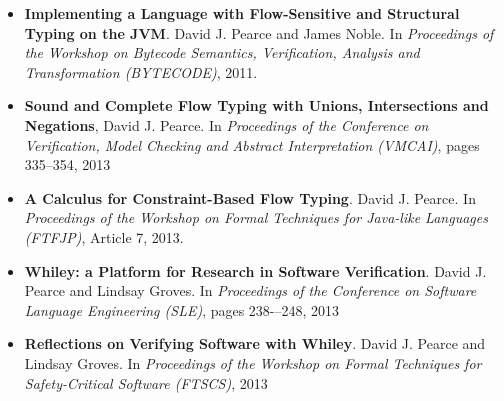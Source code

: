 \begin{itemize}
\item {\bf Implementing a Language with Flow-Sensitive and Structural Typing on the JVM}.  David J. Pearce and James Noble. In {\em Proceedings of the Workshop on Bytecode Semantics, Verification, Analysis and Transformation (BYTECODE)}, 2011. 

\item {\bf Sound and Complete Flow Typing with Unions, Intersections and Negations}, David J. Pearce.  In {\em Proceedings of the Conference on Verification, Model Checking and Abstract Interpretation (VMCAI)}, pages 335--354, 2013

\item {\bf A Calculus for Constraint-Based Flow Typing}. David J. Pearce. In {\em Proceedings of the Workshop on Formal Techniques for Java-like Languages (FTFJP)}, Article 7, 2013.

\item {\bf Whiley: a Platform for Research in Software Verification}. David J. Pearce and Lindsay Groves. In {\em Proceedings of the Conference on Software Language Engineering (SLE)}, pages 238-–248, 2013

\item {\bf Reflections on Verifying Software with Whiley}. David J. Pearce and Lindsay Groves. In {\em Proceedings of the Workshop on Formal Techniques for Safety-Critical Software (FTSCS)}, 2013

\end{itemize}
